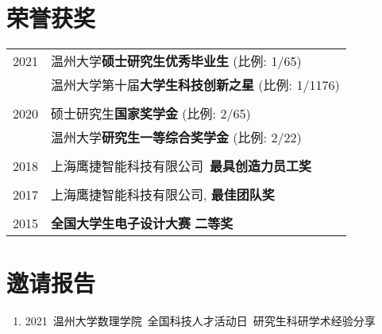 \documentclass[a4paper,10pt]{article} %
\begin{document}
\section{荣誉获奖}
\begin{tabular}{r|l}	
2021                        & 温州大学\textbf{硕士研究生优秀毕业生} (比例: 1/65)\\
         	     				& 温州大学第十届\textbf{大学生科技创新之星} (比例: 1/1176)\\
\multicolumn{2}{c}{} \\	%

2020                        & 硕士研究生\textbf{国家奖学金}  (比例: 2/65) \\   	
                            & 温州大学\textbf{研究生一等综合奖学金}  (比例: 2/22) \\
\multicolumn{2}{c}{} \\	%

2018                     & 上海鹰捷智能科技有限公司\ \textbf{最具创造力员工奖}\\
\multicolumn{2}{c}{} \\	%

2017                     & 上海鹰捷智能科技有限公司, \textbf{最佳团队奖} \\
\multicolumn{2}{c}{} \\	%

2015                     & \textbf{全国大学生电子设计大赛} \textbf{二等奖} \\
\end{tabular}


\section{邀请报告}  
\begin{small}
	\begin{enumerate}
		\item 2021\ 温州大学数理学院\ 全国科技人才活动日\ 研究生科研学术经验分享
	\end{enumerate}
\end{small}
\end{document}

